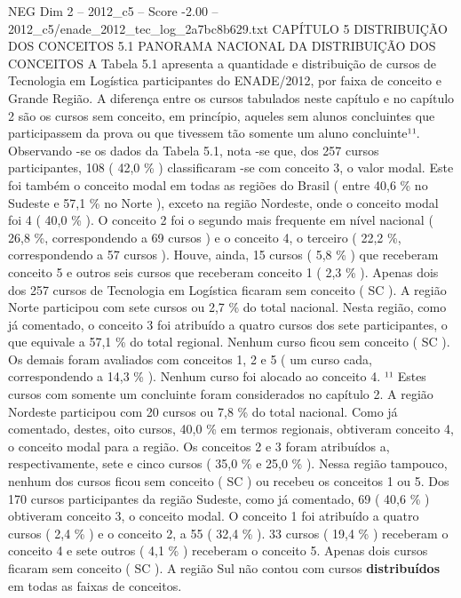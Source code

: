 \begin{textsample}{NEG Dim 2 – 2012\_c5 – Score -2.00 – 2012\_c5/enade\_2012\_tec\_log\_2a7bc8b629.txt}  \label{ex:f2_neg_075}
CAPÍTULO 5 DISTRIBUIÇÃO DOS CONCEITOS 5.1 PANORAMA NACIONAL DA DISTRIBUIÇÃO DOS CONCEITOS A Tabela 5.1 apresenta a quantidade e distribuição de cursos de Tecnologia em Logística participantes do ENADE/2012, por faixa de conceito e Grande Região.
A diferença entre os cursos tabulados neste capítulo e no capítulo 2 são os cursos sem conceito, em princípio, aqueles sem alunos concluintes que participassem da prova ou que tivessem tão somente um aluno concluinte¹¹.
Observando -se os dados da Tabela 5.1, nota -se que, dos 257 cursos participantes, 108 ( 42,0 \% ) classificaram -se com conceito 3, o valor modal.
Este foi também o conceito modal em todas as regiões do Brasil ( entre 40,6 \% no Sudeste e 57,1 \% no Norte ), exceto na região Nordeste, onde o conceito modal foi 4 ( 40,0 \% ).
O conceito 2 foi o segundo mais frequente em nível nacional ( 26,8 \%, correspondendo a 69 cursos ) e o conceito 4, o terceiro ( 22,2 \%, correspondendo a 57 cursos ).
Houve, ainda, 15 cursos ( 5,8 \% ) que receberam conceito 5 e outros seis cursos que receberam conceito 1 ( 2,3 \% ).
Apenas dois dos 257 cursos de Tecnologia em Logística ficaram sem conceito ( SC ).
A região Norte participou com sete cursos ou 2,7 \% do total nacional.
Nesta região, como já comentado, o conceito 3 foi atribuído a quatro cursos dos sete participantes, o que equivale a 57,1 \% do total regional.
Nenhum curso ficou sem conceito ( SC ).
Os demais foram avaliados com conceitos 1, 2 e 5 ( um curso cada, correspondendo a 14,3 \% ).
Nenhum curso foi alocado ao conceito 4. ¹¹ Estes cursos com somente um concluinte foram considerados no capítulo 2.
A região Nordeste participou com 20 cursos ou 7,8 \% do total nacional.
Como já comentado, destes, oito cursos, 40,0 \% em termos regionais, obtiveram conceito 4, o conceito modal para a região.
Os conceitos 2 e 3 foram atribuídos a, respectivamente, sete e cinco cursos ( 35,0 \% e 25,0 \% ).
Nessa região tampouco, nenhum dos cursos ficou sem conceito ( SC ) ou recebeu os conceitos 1 ou 5.
Dos 170 cursos participantes da região Sudeste, como já comentado, 69 ( 40,6 \% ) obtiveram conceito 3, o conceito modal.
O conceito 1 foi atribuído a quatro cursos ( 2,4 \% ) e o conceito 2, a 55 ( 32,4 \% ). 33 cursos ( 19,4 \% ) receberam o conceito 4 e sete outros ( 4,1 \% ) receberam o conceito 5.
Apenas dois cursos ficaram sem conceito ( SC ).
A região Sul não contou com cursos \textbf{distribuídos} em todas as faixas de conceitos.

\end{textsample}
